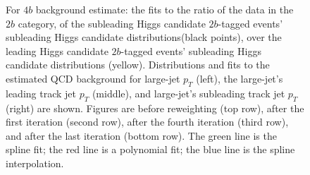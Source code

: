 \begin{figure}[htbp!]
\begin{center}
\caption{For $4b$ background estimate: the fits to the ratio of the data in the $2b$ category, of the subleading Higgs candidate $2b$-tagged events' subleading Higgs candidate distributions(black points), over the leading Higgs candidate $2b$-tagged events' subleading Higgs candidate distributions (yellow). Distributions and fits to the estimated QCD background for large-\R jet $p_{T}$ (left),  the large-\R jet's leading track jet $p_T$ (middle), and large-\R jet's subleading track jet $p_T$ (right) are shown.  Figures are before reweighting (top row), after the first iteration (second row), after the fourth iteration (third row), and after the last iteration (bottom row). The green line is the spline fit; the red line is a polynomial fit; the blue line is the spline interpolation.}
\label{fig:rw-4b-lead}
\end{center}
\end{figure}

